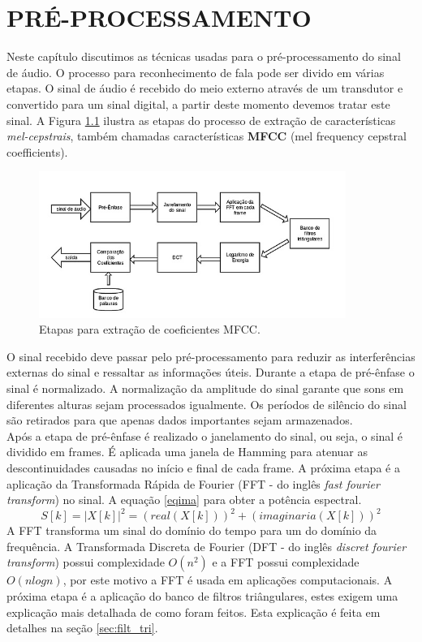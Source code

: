 \chapter{PRÉ-PROCESSAMENTO}
 \thispagestyle{plain}
\label{chap:pre_proc}
Neste capítulo discutimos as técnicas usadas para o pré-processamento do sinal de áudio.
\quad O processo para reconhecimento de fala pode ser divido em várias etapas. O sinal de áudio é recebido do meio externo através de um transdutor e convertido para um sinal digital,
a partir deste momento devemos tratar este sinal. A  Figura \ref{fig:diaMFCC} ilustra as etapas do processo de extração de características \textit{mel-cepstrais}, também chamadas características \textbf{MFCC} (mel frequency cepstral coefficients).

\begin{figure}[H]
\centering %
\includegraphics[width=10cm]{img/diaMFCC.jpg} %
\caption{Etapas para extração de coeficientes MFCC.}
\label{fig:diaMFCC}
\end{figure}

O sinal recebido deve passar pelo pré-processamento para reduzir as interferências externas do sinal e ressaltar as informações úteis. Durante a etapa de pré-ênfase o sinal é normalizado. A normalização da amplitude do sinal garante que sons em diferentes alturas sejam processados igualmente. Os períodos de silêncio do sinal são retirados para que apenas dados importantes sejam armazenados.\\ Após a etapa de pré-ênfase é realizado o janelamento do sinal, ou seja, o sinal é dividido em frames. É aplicada uma janela de Hamming para atenuar as descontinuidades causadas no início e final de cada frame.  A próxima etapa é a aplicação da Transformada Rápida de Fourier (FFT - do inglês \textit{fast fourier transform}) no sinal. A equação \ref{eqima} para obter a potência espectral.
\begin{equation}
\label{eqima}
S[k] = |X[k]|^2 = (real(X[k]))^2 +  (imaginaria(X[k]))^2
\end{equation}
 A FFT transforma um sinal do domínio do tempo para um do domínio da frequência.  A  Transformada Discreta de Fourier (DFT - do inglês \textit{discret fourier transform}) possui complexidade $O(n^2)$ e a FFT possui complexidade $O(n log n)$, por este motivo a FFT é usada em aplicações computacionais. A próxima etapa é a aplicação do banco de filtros triângulares, estes exigem uma explicação mais detalhada de como foram feitos. Esta explicação é feita em detalhes na seção \ref{sec:filt_tri}.

